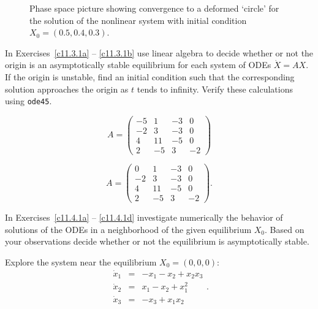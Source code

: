\begin{figure}[htb]
   \centerline{%
   }
   \caption{Phase space picture showing convergence to a deformed `circle' 
	for the solution of the nonlinear system \protect{} with 
	initial condition $X_0=(0.5,0.4,0.3)$.}
   \label{F:3perps}
\end{figure}


\EXER

\CEXER

\noindent In Exercises~\ref{c11.3.1a} -- \ref{c11.3.1b} use linear algebra to 
decide whether or not the origin is an asymptotically stable equilibrium for 
each system of ODEs $\dot{X}=AX$. If the origin is unstable, find an initial 
condition such that the corresponding solution approaches the origin as $t$ 
tends to infinity.  Verify these calculations using {\tt ode45}.
\begin{exercise} \label{c11.3.1a}
\begin{equation*}
A =  \left(\begin{array}{rrrr}
    -5  &  1  & -3  &  0\\
    -2  &  3  & -3  &  0\\
     4  & 11  & -5  &  0\\
     2  & -5  &  3  & -2
\end{array}\right)
\end{equation*}
\end{exercise}
\begin{exercise} \label{c11.3.1b}
\begin{equation*}
A =  \left(\begin{array}{rrrr}
     0  &  1  & -3  &  0\\
    -2  &  3  & -3  &  0\\
     4  & 11  & -5  &  0\\
     2  & -5  &  3  & -2
\end{array}\right).
\end{equation*}
\end{exercise}

\noindent In Exercises~\ref{c11.4.1a} -- \ref{c11.4.1d} investigate
numerically the behavior of solutions of the ODEs in a neighborhood
of the given equilibrium $X_0$.  Based on your observations decide
whether or not the equilibrium is asymptotically stable.

\begin{exercise} \label{c11.4.1a}
Explore the system  near the equilibrium $X_0 = (0,0,0)$:
\begin{equation*}  \label{e11.4.1a}
\begin{array}{rcl}
\dot{x}_1 & = & -x_1 - x_2 + x_2 x_3\\
\dot{x}_2 & = & x_1 - x_2 +x_1^2\\
\dot{x}_3 & = & -x_3 + x_1 x_2
\end{array}.
\end{equation*}
\end{exercise}

